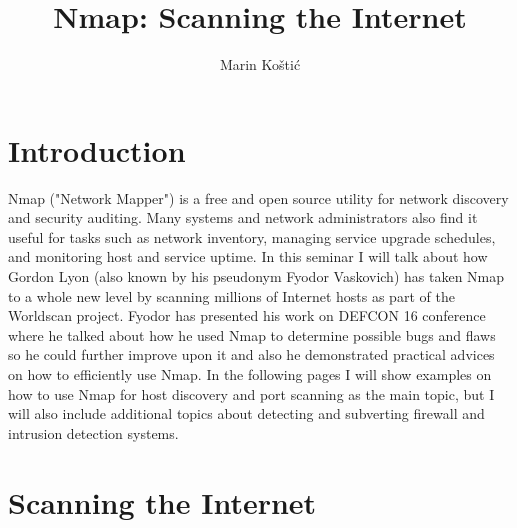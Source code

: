 \documentclass[times, utf8, seminar,english]{fer}
\begin{document}
\title{Nmap: Scanning the Internet}
\author{Marin Koštić}

\maketitle

\tableofcontents

\chapter{Introduction}
Nmap ("Network Mapper") is a free and open source utility for network discovery and security auditing. Many systems and network administrators also find it useful for tasks such as network inventory, managing service upgrade schedules, and monitoring host and service uptime. In this seminar I will talk about how Gordon Lyon (also known by his pseudonym Fyodor Vaskovich) has taken Nmap to a whole new level by scanning millions of Internet hosts as part of the Worldscan project. Fyodor has presented his work on DEFCON 16 conference where he talked about how he used Nmap to determine possible bugs and flaws so he could further improve upon it and also he demonstrated practical advices on how to efficiently use Nmap. In the following pages I will show examples on how to use Nmap for host discovery and port scanning as the main topic, but I will also include additional topics about detecting and subverting firewall and intrusion detection systems.

\chapter{Scanning the Internet}
\end{document}
